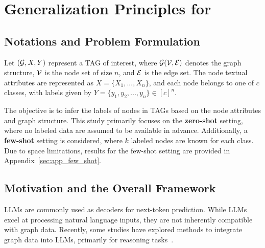 


\section{Generalization Principles for \proj}

\subsection{Notations and Problem Formulation} 

Let $(\mathcal{G}, X, Y)$ represent a TAG of interest, where $\mathcal{G}(\mathcal{V}, \mathcal{E})$ denotes the graph structure, $\mathcal{V}$ is the node set of size $n$, and $\mathcal{E}$ is the edge set. The node textual attributes are represented as $X = \{X_1, ..., X_n\}$, and each node belongs to one of $c$ classes, with labels given by $Y=\{y_1,y_2,...,y_n\} \in [c]^n$. 

The objective is to infer the labels of nodes in TAGs based on the node attributes and graph structure. This study primarily focuses on the \textbf{zero-shot} setting, where no labeled data are assumed to be available in advance. Additionally, a \textbf{few-shot} setting is considered, where $k$ labeled nodes are known for each class. Due to space limitations, results for the few-shot setting are provided in Appendix~\ref{sec:app_few_shot}.  %

\subsection{Motivation and the Overall Framework}
 LLMs are commonly used as decoders for next-token prediction. While LLMs excel at processing natural language inputs, they are not inherently compatible with graph data. Recently, some studies have explored methods to integrate graph data into LLMs, primarily for reasoning tasks~\cite{perozzi2024let, zhang2024can, tang2024grapharena}. 


